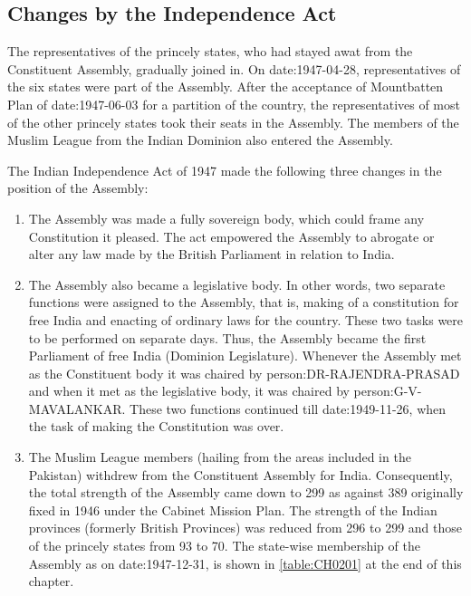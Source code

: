 \begin{multicol}{2}
\section{Changes by the Independence Act}

The representatives of the princely states, who had stayed awat from the Constituent Assembly, gradually joined in. On \gls{date:1947-04-28}, representatives of the six states were part of the Assembly. After the acceptance of Mountbatten Plan of \gls{date:1947-06-03} for a partition of the country, the representatives of most of the other princely states took their seats in the Assembly. The members of the Muslim League from the Indian Dominion also entered the Assembly.

The Indian Independence Act of 1947 made the following three changes in the position of the Assembly:

\begin{enumerate}
  \item The Assembly was made a fully sovereign body, which could frame any Constitution it pleased. The act empowered the Assembly to abrogate or alter any law made by the British Parliament in relation to India.
  \item The Assembly also became a legislative body. In other words, two separate functions were assigned to the Assembly, that is, making of a constitution for free India and enacting of ordinary laws for the country. These two tasks were to be performed on separate days. Thus, the Assembly became the first Parliament of free India (Dominion Legislature). Whenever the Assembly met as the Constituent body it was chaired by \gls{person:DR-RAJENDRA-PRASAD} and when it met as the legislative body, it was chaired by \gls{person:G-V-MAVALANKAR}. These two functions continued till \gls{date:1949-11-26}, when the task of making the Constitution was over.
  \item The Muslim League members (hailing from the areas included in the Pakistan) withdrew from the Constituent Assembly for India. Consequently, the total strength of the Assembly came down to 299 as against 389 originally fixed in 1946 under the Cabinet Mission Plan. The strength of the Indian provinces (formerly British Provinces) was reduced from 296 to 299 and those of the princely states from 93 to 70. The state-wise membership of the Assembly as on \gls{date:1947-12-31}, is shown in \ref{table:CH0201} at the end of this chapter.
\end{enumerate}


\end{multicol}
